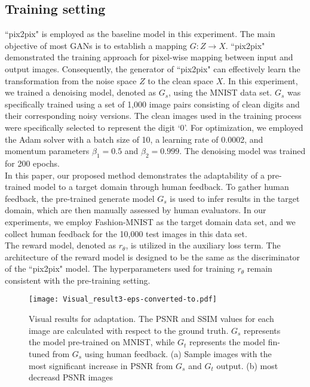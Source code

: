 \documentclass[lettersize,journal]{IEEEtran}
\begin{document}
\subsection{Training setting}
 ``pix2pix"\cite{isola2017image} is employed as the baseline model in this experiment. The main objective of most GANs is to establish a mapping $G: Z\rightarrow X$. ``pix2pix" demonstrated the training approach for pixel-wise mapping between input and output images. Consequently, the generator of ``pix2pix" can effectively learn the transformation from the noise space $Z$ to the clean space $X$. In this experiment, we trained a denoising model, denoted as $G_s$, using the MNIST data set. $G_s$ was specifically trained using a set of 1,000 image pairs consisting of clean digits and their corresponding noisy versions. The clean images used in the training process were specifically selected to represent the digit `0'. For optimization, we employed the Adam solver \cite{kingma2014adam} with a batch size of 10, a learning rate of 0.0002, and momentum parameters $\beta_1=0.5$ and $\beta_2=0.999$. The denoising model was trained for 200 epochs.\\

 In this paper, our proposed method demonstrates the adaptability of a pre-trained model to a target domain through human feedback. To gather human feedback, the pre-trained generate model $G_s$ is used to infer results in the target domain, which are then manually assessed by human evaluators. In our experiments, we employ Fashion-MNIST as the target domain data set, and we collect human feedback for the 10,000 test images in this data set.\\

 The reward model, denoted as $r_\theta$, is utilized in the auxiliary loss term. The architecture of the reward model is designed to be the same as the discriminator of the ``pix2pix" model. The hyperparameters used for training $r_\theta$ remain consistent with the pre-training setting.\\

\begin{figure}[!t]
\centering
\texttt{[image: Visual\_result3-eps-converted-to.pdf]}
\caption{Visual results for adaptation. The PSNR and SSIM values for each image are calculated with respect to the ground truth. $G_s$ represents the model pre-trained on MNIST, while $G_t$ represents the model fin-tuned from $G_s$ using human feedback. (a) Sample images with the most significant increase in PSNR from $G_s$ and $G_t$ output. (b) most decreasd PSNR images }
\label{visual_result_for_denoising}
\end{figure}
\end{document}
